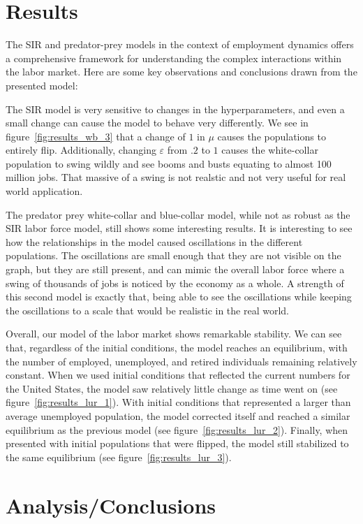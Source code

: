 \documentclass[11pt]{amsart}
\begin{document}
\section{Results}
The SIR and predator-prey models in the context of employment dynamics offers a comprehensive framework for understanding 
the complex interactions within the labor market. Here are some key observations and conclusions drawn from the presented model:

The SIR model is very sensitive to changes in the hyperparameters, and even a small change can cause the model to behave very 
differently. We see in figure~\ref{fig:results_wb_3} that a change of $1$ in $\mu$ causes the populations to entirely flip. 
Additionally, changing $\varepsilon$ from $.2$ to $1$ causes the white-collar population to swing wildly and see booms and 
busts equating to almost 100 million jobs. That massive of a swing is not realstic and not very useful for real world application.

The predator prey white-collar and blue-collar model, while not as robust as the SIR labor force model, still shows some interesting results. It is interesting to see how the relationships in the model
caused oscillations in the different populations. The oscillations are small enough that they are not visible on the graph, but they are still present, and can mimic the overall 
labor force where a swing of thousands of jobs is noticed by the economy as a whole. A strength of this second model is exactly that, being able to see the oscillations while
keeping the oscillations to a scale that would be realistic in the real world.

Overall, our model of the labor market shows remarkable stability. 
We can see that, regardless of the initial conditions, the model reaches an equilibrium, 
with the number of employed, unemployed, and retired individuals remaining relatively constant.
When we used initial conditions that reflected the current numbers for the United States,
the model saw relatively little change as time went on (see figure~\ref{fig:results_lur_1}).
With initial conditions that represented a larger than average unemployed population, the model corrected itself and reached a
similar equilibrium as the previous model (see figure~\ref{fig:results_lur_2}).
Finally, when presented with initial populations that were flipped, the model still stabilized to the same equilibrium
(see figure~\ref{fig:results_lur_3}).

\section{Analysis/Conclusions}
\end{document}
